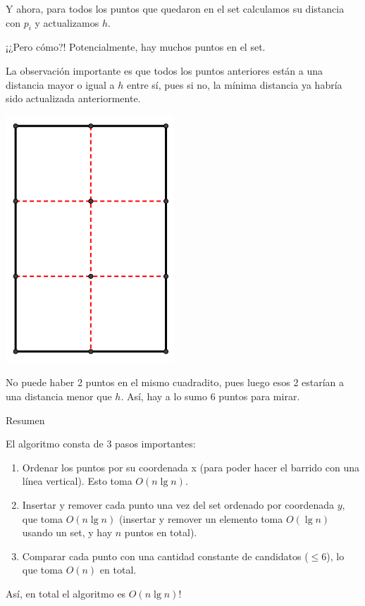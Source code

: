 \documentclass[compress]{beamer}
\newcommand{\bigpause}{\bigskip \pause}
\begin{document}
\begin{frame}

Y ahora, para todos los puntos que quedaron en el set calculamos su distancia con $p_i$ y actualizamos $h$.

¡¿Pero c\'omo?! Potencialmente, hay muchos puntos en el set. \bigpause

\end{frame}

\begin{frame}
La observaci\'on importante es que todos los puntos anteriores est\'an a una distancia mayor o igual a $h$ entre s\'i, 
pues si no, la m\'inima distancia ya habr\'ia sido actualizada anteriormente.

\begin{center}
\includegraphics[scale=0.3]{images/seis_cuadrados.png}
\end{center}

No puede haber 2 puntos en el mismo cuadradito, pues luego esos 2 estar\'ian a una distancia menor que $h$. As\'i, hay a 
lo sumo 6 puntos para mirar.

\end{frame}

\begin{frame}{Resumen}

El algoritmo consta de 3 pasos importantes:

\begin{enumerate}
\item Ordenar los puntos por su coordenada x (para poder hacer el barrido con una l\'inea vertical). Esto toma $O(n \lg n)$.
\item Insertar y remover cada punto una vez del set ordenado por coordenada $y$, que toma $O(n \lg n)$ (insertar y remover un elemento toma $O(\lg n)$ usando un set, y hay $n$ puntos en total).
\item Comparar cada punto con una cantidad constante de candidatos ($\leq 6$), lo que toma $O(n)$ en total.
\end{enumerate}
   
As\'i, en total el algoritmo es $O(n \lg n)$!
\end{frame}
\end{document}
